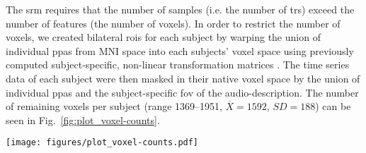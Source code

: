 

The \ac{srm} requires that the number of samples (i.e. the number of \acp{tr})
exceed the number of features (the number of voxels).
%
In order to restrict the number of voxels, we created bilateral \acp{roi} for
each subject by warping the union of individual \acp{ppa}
\citep[s.][]{haeusler2022processing} from MNI space into each subjects' voxel
space using previously computed subject-specific, non-linear transformation
matrices
\citep[][\href{https://github.com/psychoinformatics-de/studyforrest-data-templatetransforms
}{\url{github.com/psychoinformatics-de/studyforrest-data-templatetransforms}}]{hanke2014audiomovie}.
The time series data of each subject were then masked in their native voxel
space by the union of individual \acp{ppa} and the subject-specific \ac{fov} of
the audio-description.
The number of remaining voxels per subject (range 1369--1951,
$\overline{X}=1592$, $SD=188$) can be seen in Fig.~\ref{fig:plot_voxel-counts}.


\begin{figure*}[tbp]
\centering
\texttt{[image: figures/plot\_voxel-counts.pdf]}
\caption{
%
\textbf{Number of voxels in the bilateral regions of interest (ROIs)
of each subject.}
%
In order to reduce the number of voxels, we warped the union of
individual \acp{ppa} \citep[cf. Fig. 1 in][]{haeusler2022processing} from
MNI152 space into each subject's native voxel space.
%
The remaining voxels of each subject were further constrained to those
voxels that are included in the respective subject's \ac{fov} of the
audio-description \citep[cf.][]{hanke2014audiomovie}.
}
\label{fig:plot_voxel-counts}
\end{figure*}


